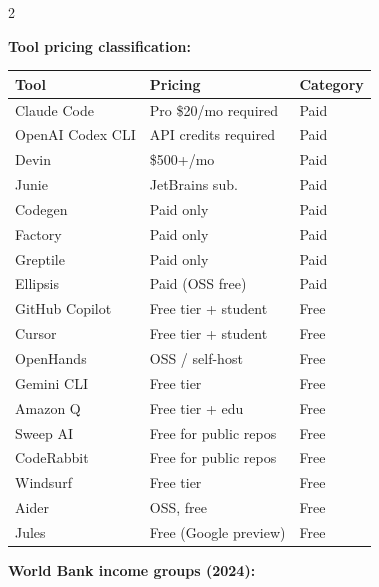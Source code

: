\documentclass[10pt,a4paper]{article}
\begin{document}
\vspace{6pt}
\begin{multicols}{2}

\textbf{Tool pricing classification:}

\begin{tabular}{@{}lll@{}}
\toprule
Tool & Pricing & Category \\
\midrule
Claude Code       & Pro \$20/mo required  & Paid \\
OpenAI Codex CLI  & API credits required  & Paid \\
Devin             & \$500+/mo             & Paid \\
Junie             & JetBrains sub.        & Paid \\
Codegen           & Paid only             & Paid \\
Factory           & Paid only             & Paid \\
Greptile          & Paid only             & Paid \\
Ellipsis          & Paid (OSS free)       & Paid \\
\midrule
GitHub Copilot    & Free tier + student   & Free \\
Cursor            & Free tier + student   & Free \\
OpenHands         & OSS / self-host       & Free \\
Gemini CLI        & Free tier             & Free \\
Amazon Q          & Free tier + edu       & Free \\
Sweep AI          & Free for public repos & Free \\
CodeRabbit        & Free for public repos & Free \\
Windsurf          & Free tier             & Free \\
Aider             & OSS, free             & Free \\
Jules             & Free (Google preview) & Free \\
\bottomrule
\end{tabular}

\columnbreak

\textbf{World Bank income groups (2024):}


\end{multicols}
\end{document}
